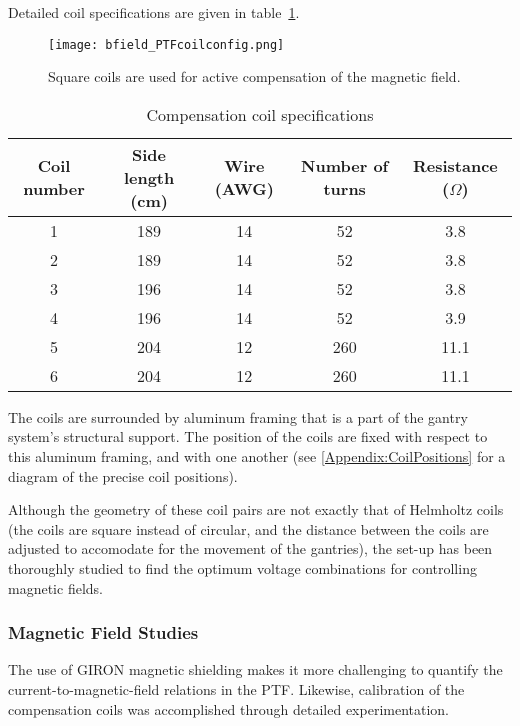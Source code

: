 Detailed coil specifications are given in table~\ref{tab:coil_specs}.
%
\begin{figure}[h]
  \begin{center}
  \texttt{[image: bfield\_PTFcoilconfig.png]}
  \caption{Square coils are used for active compensation of the magnetic field.}
  \label{fig:coils}
  \end{center}
\end{figure}
%
\begin{table}[h]
\begin{center}
  \begin{tabular}{|c|c c c c|}
    \hline
    Coil number & Side length (cm) & Wire (AWG) & Number of turns & Resistance ($\Omega$)\\
    \hline\hline
    1 & 189 & 14 & 52 & 3.8 \\
    2 & 189 & 14 & 52 & 3.8 \\
    3 & 196 & 14 & 52 & 3.8 \\
    4 & 196 & 14 & 52 & 3.9 \\
    5 & 204 & 12 & 260 & 11.1 \\
    6 & 204 & 12 & 260 & 11.1 \\
    \hline
  \end{tabular}
\end{center}
\caption{Compensation coil specifications}
\label{tab:coil_specs}
\end{table}
%

The coils are surrounded by aluminum framing that is a part of the gantry system's structural support. The position of the coils are fixed with respect to this aluminum framing, and with one another (see \ref{Appendix:CoilPositions} for a diagram of the precise coil positions).

Although the geometry of these coil pairs are not exactly that of Helmholtz coils (the coils are square instead of circular, and the distance between the coils are adjusted to accomodate for the movement of the gantries), the set-up has been thoroughly studied to find the optimum voltage combinations for controlling magnetic fields.

\subsubsection{Magnetic Field Studies}

The use of GIRON magnetic shielding makes it more challenging to quantify the current-to-magnetic-field relations in the PTF. Likewise, calibration of the compensation coils was accomplished through detailed experimentation.


